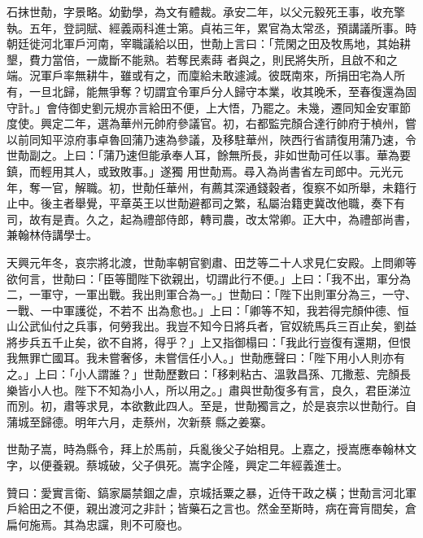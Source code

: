 \begin{pinyinscope}
 石抹世勣，字景略。幼勤學，為文有體裁。承安二年，以父元毅死王事，收充擎執。五年，登詞賦、經義兩科進士第。貞祐三年，累官為太常丞，預講議所事。時朝廷徙河北軍戶河南，宰職議給以田，世勣上言曰：「荒閑之田及牧馬地，其始耕墾，費力當倍，一歲斷不能熟。若奪民素蒔
 者與之，則民將失所，且啟不和之端。況軍戶率無耕牛，雖或有之，而廩給未敢遽減。彼既南來，所捐田宅為人所有，一旦北歸，能無爭奪？切謂宜令軍戶分人歸守本業，收其晚禾，至春復還為固守計。」會侍御史劉元規亦言給田不便，上大悟，乃罷之。未幾，遷同知金安軍節度使。興定二年，選為華州元帥府參議官。初，右都監完顏合達行帥府于楨州，嘗以前同知平涼府事卓魯回蒲乃速為參議，及移駐華州，陜西行省請復用蒲乃速，令世勣副之。上曰：「蒲乃速但能承奉人耳，餘無所長，非如世勣可任以事。華為要鎮，而輕用其人，或致敗事。」遂獨
 用世勣焉。尋入為尚書省左司郎中。元光元年，奪一官，解職。初，世勣任華州，有薦其深通錢穀者，復察不如所舉，未籍行止中。後主者舉覺，平章英王以世勣避都司之繁，私屬治籍吏冀改他職，奏下有司，故有是責。久之，起為禮部侍郎，轉司農，改太常卿。正大中，為禮部尚書，兼翰林侍講學士。



 天興元年冬，哀宗將北渡，世勣率朝官劉肅、田芝等二十人求見仁安殿。上問卿等欲何言，世勣曰：「臣等聞陛下欲親出，切謂此行不便。」上曰：「我不出，軍分為二，一軍守，一軍出戰。我出則軍合為一。」世勣曰：「陛下出則軍分為三，一守、一戰、一中軍護從，不若不
 出為愈也。」上曰：「卿等不知，我若得完顏仲德、恒山公武仙付之兵事，何勞我出。我豈不知今日將兵者，官奴統馬兵三百止矣，劉益將步兵五千止矣，欲不自將，得乎？」上又指御榻曰：「我此行豈復有還期，但恨我無罪亡國耳。我未嘗奢侈，未嘗信任小人。」世勣應聲曰：「陛下用小人則亦有之。」上曰：「小人謂誰？」世勣歷數曰：「移剌粘古、溫敦昌孫、兀撒惹、完顏長樂皆小人也。陛下不知為小人，所以用之。」肅與世勣復多有言，良久，君臣涕泣而別。初，肅等求見，本欲數此四人。至是，世勣獨言之，於是哀宗以世勣行。自蒲城至歸德。明年六月，走蔡州，次新蔡
 縣之姜寨。



 世勣子嵩，時為縣令，拜上於馬前，兵亂後父子始相見。上嘉之，授嵩應奉翰林文字，以便養親。蔡城破，父子俱死。嵩字企隆，興定二年經義進士。



 贊曰：愛實言衛、鎬家屬禁錮之虐，京城括粟之暴，近侍干政之橫；世勣言河北軍戶給田之不便，親出渡河之非計；皆藥石之言也。然金至斯時，病在膏肓間矣，倉扁何施焉。其為忠讜，則不可廢也。



\end{pinyinscope}